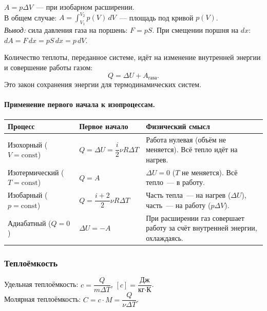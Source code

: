 \documentclass[12pt]{article}
\begin{document}
\begin{definition}
	$A = p\Delta V$~--- при изобарном расширении.\\
	В общем случае: $A = \int_{V_1}^{V_2} p(V) \, dV$~--- площадь под кривой $p(V)$.\\
	\textit{Вывод:} сила давления газа на поршень: $F = pS$. При смещении поршня на $dx$: $dA = F\,dx = pS\,dx = p\,dV$.
\end{definition}

\begin{law}
	Количество теплоты, переданное системе, идёт на изменение внутренней энергии и совершение работы газом:
	\[
		Q = \Delta U + A_{\text{газа}}.
	\]
	Это закон сохранения энергии для термодинамических систем.
\end{law}

\paragraph{Применение первого начала к изопроцессам.}

\begin{center}
\begin{xltabular}{\textwidth}{|X|X|X|}
	\hline
	\textbf{Процесс} & \textbf{Первое начало} & \textbf{Физический смысл}\\
	\hline
	Изохорный ($V = \text{const}$) & $Q = \Delta U = \dfrac{i}{2}\nu R\Delta T$ & Работа нулевая (объём не меняется). Всё тепло идёт на нагрев.\\
	\hline
	Изотермический ($T = \text{const}$) & $Q = A$ & $\Delta U = 0$ ($T$ не меняется). Всё тепло~--- в работу.\\
	\hline
	Изобарный ($p = \text{const}$) & $Q = \dfrac{i+2}{2}\nu R\Delta T$ & Часть тепла~--- на нагрев ($\Delta U$), часть~--- на работу ($p\Delta V$).\\
	\hline
	Адиабатный ($Q = 0$) & $\Delta U = -A$ & При расширении газ совершает работу за счёт внутренней энергии, охлаждаясь.\\
	\hline
\end{xltabular}
\end{center}

\subsubsection{Теплоёмкость}

\begin{definition}
	Удельная теплоёмкость: $c = \dfrac{Q}{m\Delta T}$, $[c] = \dfrac{\text{Дж}}{\text{кг}\cdot\text{К}}$.\\
	Молярная теплоёмкость: $C = c \cdot M = \dfrac{Q}{\nu \Delta T}$.
\end{definition}
\end{document}
